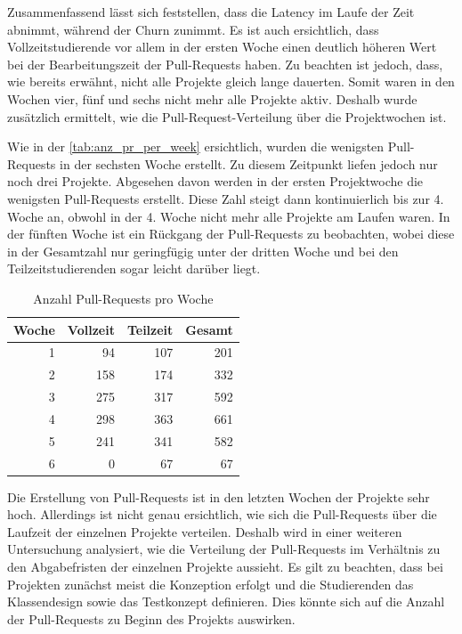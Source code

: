 Zusammenfassend lässt sich feststellen, dass die Latency im Laufe der Zeit abnimmt, während der Churn zunimmt. Es ist auch ersichtlich, dass Vollzeitstudierende vor allem in der ersten Woche einen deutlich höheren Wert bei der Bearbeitungszeit der Pull-Requests haben. Zu beachten ist jedoch, dass, wie bereits erwähnt, nicht alle Projekte gleich lange dauerten. Somit waren in den Wochen vier, fünf und sechs nicht mehr alle Projekte aktiv. Deshalb wurde zusätzlich ermittelt, wie die Pull-Request-Verteilung über die Projektwochen ist.

Wie in der \autoref{tab:anz_pr_per_week} ersichtlich, wurden die wenigsten Pull-Requests in der sechsten Woche erstellt. Zu diesem Zeitpunkt liefen jedoch nur noch drei Projekte. Abgesehen davon werden in der ersten Projektwoche die wenigsten Pull-Requests erstellt. Diese Zahl steigt dann kontinuierlich bis zur 4. Woche an, obwohl in der 4. Woche nicht mehr alle Projekte am Laufen waren. In der fünften Woche ist ein Rückgang der Pull-Requests zu beobachten, wobei diese in der Gesamtzahl nur geringfügig unter der dritten Woche und bei den Teilzeitstudierenden sogar leicht darüber liegt. 

\begin{table}[ht]
\caption{Anzahl Pull-Requests pro Woche}
\label{tab:anz_pr_per_week}
\centering
\begin{tabular}{rrrr}
\toprule
\textbf{Woche} & \textbf{Vollzeit} & \textbf{Teilzeit} & \textbf{Gesamt} \\
\midrule
1 & 94 & 107 & 201 \\
2 & 158 & 174 & 332\\
3 & 275 & 317 & 592\\
4 & 298 & 363 & 661\\
5 & 241 & 341 & 582 \\
6 & 0 & 67 & 67\\
\bottomrule
\end{tabular}
\end{table}

Die Erstellung von Pull-Requests ist in den letzten Wochen der Projekte sehr hoch. Allerdings ist nicht genau ersichtlich, wie sich die Pull-Requests über die Laufzeit der einzelnen Projekte verteilen. Deshalb wird in einer weiteren Untersuchung analysiert, wie die Verteilung der Pull-Requests im Verhältnis zu den Abgabefristen der einzelnen Projekte aussieht. Es gilt zu beachten, dass bei Projekten zunächst meist die Konzeption erfolgt und die Studierenden das Klassendesign sowie das Testkonzept definieren. Dies könnte sich auf die Anzahl der Pull-Requests zu Beginn des Projekts auswirken.

